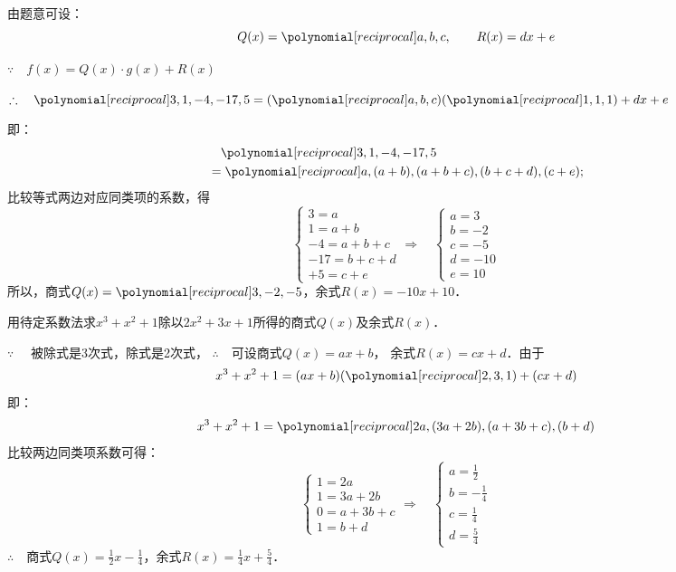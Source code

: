 \begin{solution}
    由题意可设：
\[Q(x)=\poly{a,b,c},\qquad R(x)=dx+e\]

$\because\quad f(x)=Q(x)\cdot g(x)+R(x)$   

$\therefore\quad \poly{3,1,-4,-17,5}=(\poly{a,b,c})(\poly{1,1,1})+dx+e$

即：
\[\begin{split}
    &\quad \poly{3,1,-4,-17,5}\\
    &=\poly{a,(a+b),(a+b+c),(b+c+d),(c+e)};
\end{split}\] 
比较等式两边对应同类项的系数，得
\[\begin{cases}
    3=a\\
    1=a+b\\
    -4=a+b+c\\
    -17=b+c+d\\
    +5=c+e
\end{cases}\Rightarrow\quad  \begin{cases}
    a=3\\
    b=-2\\
    c=-5\\
    d=-10\\
    e=10
\end{cases}\]
所以，商式$Q(x)=\poly{3,-2,-5}$，余式$R(x)=-10x+10$．
\end{solution}

\begin{example}
    用待定系数法求$x^3+x^2+1$除以$2x^2+3x+1$所得的商式$Q(x)$及余式$R(x)$．
\end{example}

\begin{solution}
$\because\quad $ 被除式是3次式，除式是2次式，
$\therefore\quad $可设商式$Q(x)=ax+b$，
余式$R(x)=cx+d$．由于
\[x^3+x^2+1=(ax+b)(\poly{2,3,1})+(cx+d)\]
即：
\[x^3+x^2+1=\poly{2a, (3a+2b), (a+3b+c), (b+d)}\]
比较两边同类项系数可得：
\[\begin{cases}
  1=2a\\
  1=3a+2b\\
  0=a+3b+c\\
  1=b+d  
\end{cases}\Rightarrow\quad \begin{cases}
    a=\frac{1}{2}\\
    b=-\frac{1}{4}\\
    c=\frac{1}{4}\\
    d=\frac{5}{4}
\end{cases}\]
$\therefore\quad $商式$Q(x)=\frac{1}{2}x-\frac{1}{4}$，余式$R(x)=\frac{1}{4}x+\frac{5}{4}$．
\end{solution}

